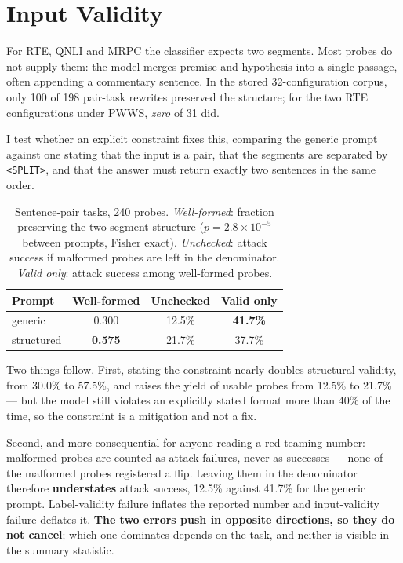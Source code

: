 \documentclass[11pt]{article}
\begin{document}
\section{Input Validity}
\label{sec:input}

For RTE, QNLI and MRPC the classifier expects two segments. Most probes do not
supply them: the model merges premise and hypothesis into a single passage, often
appending a commentary sentence. In the stored 32-configuration corpus, only 100
of 198 pair-task rewrites preserved the structure; for the two RTE configurations
under PWWS, \emph{zero} of 31 did.

I test whether an explicit constraint fixes this, comparing the generic prompt
against one stating that the input is a pair, that the segments are separated by
\texttt{<SPLIT>}, and that the answer must return exactly two sentences in the
same order.

\begin{table}[t]
\centering
\small
\begin{tabular}{lccc}
\toprule
Prompt & Well-formed & Unchecked & Valid only \\
\midrule
generic    & 0.300 & 12.5\% & \textbf{41.7\%} \\
structured & \textbf{0.575} & 21.7\% & 37.7\% \\
\bottomrule
\end{tabular}
\caption{Sentence-pair tasks, 240 probes. \emph{Well-formed}: fraction preserving
the two-segment structure ($p=2.8\times10^{-5}$ between prompts, Fisher exact).
\emph{Unchecked}: attack success if malformed probes are left in the denominator.
\emph{Valid only}: attack success among well-formed probes.}
\label{tab:pair}
\end{table}

Two things follow. First, stating the constraint nearly doubles structural
validity, from 30.0\% to 57.5\%, and raises the yield of usable probes from
12.5\% to 21.7\% --- but the model still violates an explicitly stated format
more than 40\% of the time, so the constraint is a mitigation and not a fix.

Second, and more consequential for anyone reading a red-teaming number:
malformed probes are counted as attack failures, never as successes --- none of
the malformed probes registered a flip. Leaving them in the denominator therefore
\textbf{understates} attack success, 12.5\% against 41.7\% for the generic
prompt. Label-validity failure inflates the reported number and input-validity
failure deflates it. \textbf{The two errors push in opposite directions, so they
do not cancel}; which one dominates depends on the task, and neither is visible
in the summary statistic.
\end{document}
